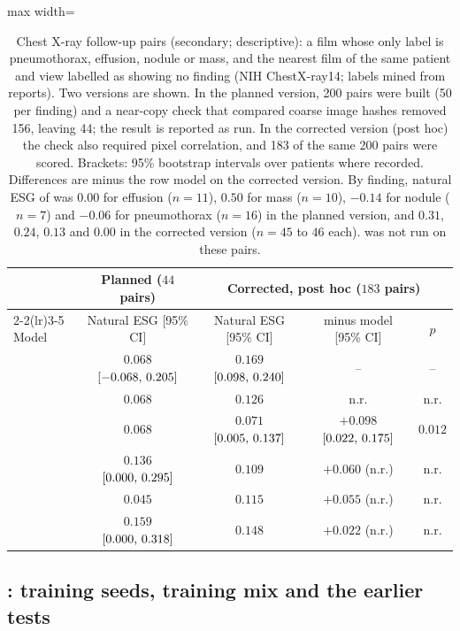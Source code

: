 \begin{table}[!htbp]
\caption{Chest X-ray follow-up pairs (secondary; descriptive): a film whose only label is pneumothorax, effusion, nodule or mass, and the nearest film of the same patient and view labelled as showing no finding (NIH ChestX-ray14; labels mined from reports). Two versions are shown. In the planned version, 200 pairs were built (50 per finding) and a near-copy check that compared coarse image hashes removed 156, leaving 44; the result is reported as run. In the corrected version (post hoc) the check also required pixel correlation, and 183 of the same 200 pairs were scored. Brackets: 95\% bootstrap intervals over patients where recorded. Differences are \ms{} minus the row model on the corrected version. By finding, natural ESG of \ms{} was $0.00$ for effusion ($n = 11$), $0.50$ for mass ($n = 10$), $-0.14$ for nodule ($n = 7$) and $-0.06$ for pneumothorax ($n = 16$) in the planned version, and $0.31$, $0.24$, $0.13$ and $0.00$ in the corrected version ($n = 45$ to $46$ each). \msn{} was not run on these pairs.}
\label{tab:s_cxrpairs}
\centering
\footnotesize
\begin{adjustbox}{max width=\linewidth}
\begin{tabular}{l c c cc}
\toprule
 & Planned ($44$ pairs) & \multicolumn{3}{c}{Corrected, post hoc ($183$ pairs)} \\
\cmidrule(lr){2-2}\cmidrule(lr){3-5}
Model & Natural ESG [95\% CI] & Natural ESG [95\% CI] & \ms{} minus model [95\% CI] & $p$ \\
\midrule
\ms{} & $0.068$ $[-0.068,\,0.205]$ & $0.169$ $[0.098,\,0.240]$ & -- & -- \\
\msp{} & $0.068$ & $0.126$ & n.r. & n.r. \\
\base{} & $0.068$ & $0.071$ $[0.005,\,0.137]$ & $+0.098$ $[0.022,\,0.175]$ & $0.012$ \\
\gem{} & $0.136$ $[0.000,\,0.295]$ & $0.109$ & $+0.060$ (n.r.) & n.r. \\
\opus{} & $0.045$ & $0.115$ & $+0.055$ (n.r.) & n.r. \\
\gpt{} & $0.159$ $[0.000,\,0.318]$ & $0.148$ & $+0.022$ (n.r.) & n.r. \\
\bottomrule
\end{tabular}
\end{adjustbox}
\end{table}

\clearpage
\subsection{\texorpdfstring{\msn}{MedScope-4B-N}: training seeds, training mix and the earlier tests}
\label{subsec:s_nmodel}

